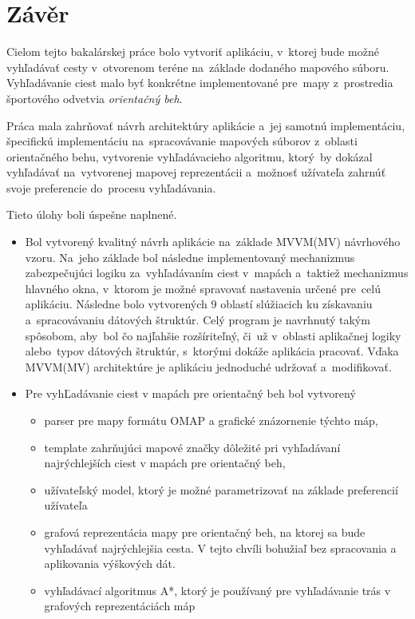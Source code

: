 \chapter*{Závěr}

Cielom tejto bakalárskej práce bolo vytvoriť aplikáciu, v~ktorej bude možné vyhľadávať cesty v~otvorenom teréne na~základe dodaného mapového súboru. Vyhľadávanie ciest malo byť konkrétne implementované pre~mapy z~prostredia športového odvetvia \textit{orientačný beh}. 

Práca mala zahrňovať návrh architektúry aplikácie a~jej samotnú implementáciu, špecifickú implementáciu na~spracovávanie mapových súborov z~oblasti orientačného behu, vytvorenie vyhľadávacieho algoritmu, ktorý~by dokázal vyhľadávať na~vytvorenej mapovej reprezentácii a~možnosť užívateľa zahrnúť svoje preferencie do~procesu vyhľadávania. 

Tieto úlohy boli úspešne naplnené. 
\begin{itemize}
    \item Bol vytvorený kvalitný návrh aplikácie na~základe MVVM(MV) návrhového vzoru. Na~jeho základe bol následne implementovaný mechanizmus zabezpečujúci logiku za~vyhľadávaním ciest v~mapách a~taktiež mechanizmus hlavného okna, v~ktorom je možné spravovať nastavenia určené pre~celú aplikáciu. Následne bolo vytvorených 9 oblastí slúžiacich ku získavaniu a~spracovávaniu dátových štruktúr. Celý program je navrhnutý takým spôsobom, aby~bol čo najľahšie rozšíriteľný, či~už v~oblasti aplikačnej logiky alebo~typov dátových štruktúr, s~ktorými dokáže aplikácia pracovať. Vďaka MVVM(MV) architektúre je aplikáciu jednoduché udržovať a~modifikovať.
    \item Pre vyhĽadávanie ciest v mapách pre orientačný beh bol vytvorený
    \begin{itemize}
        \item parser pre mapy formátu OMAP a grafické znázornenie týchto máp,
        \item template zahrňujúci mapové značky dôležité pri vyhľadávaní najrýchlejších ciest v mapách pre orientačný beh,
        \item užívateľský model, ktorý je možné parametrizovať na základe preferencií užívateľa
        \item grafová reprezentácia mapy pre orientačný beh, na ktorej sa bude vyhľadávať najrýchlejšia cesta. V tejto chvíli bohužiaľ bez spracovania a aplikovania výškových dát. 
        \item vyhľadávací algoritmus A*, ktorý je používaný pre vyhľadávanie trás v grafových reprezentáciách máp
    \end{itemize}
\end{itemize}

